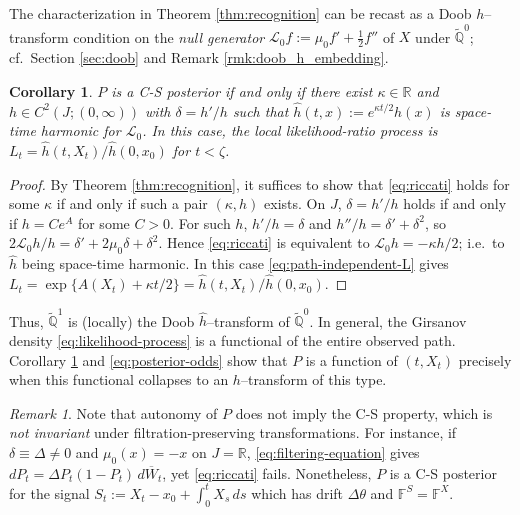 \documentclass[11pt, reqno]{amsart}
\theoremstyle{plain}
\newtheorem{corollary}[theorem]{Corollary}
\theoremstyle{remark}
\newtheorem{remark}[theorem]{Remark}
\numberwithin{equation}{section}
\begin{document}
%
%
%
%
%
%
%
%
%
%
%
%
%
%

%
%
%
%
%
%
%
%
%
%
%
%
%
%
%
%
%
%
%
%


%

The characterization in Theorem \ref{thm:recognition} can be recast as a Doob
$h$--transform condition on the \emph{null generator}
$\mathcal L_0f:=\mu_0f'+\tfrac12f''$ of $X$ under $\widetilde{\mathbb Q}^0$;
cf.\ Section \ref{sec:doob} and Remark \ref{rmk:doob_h_embedding}.

\begin{corollary}\label{cor:h-transform}
$P$ is a C-S posterior if and only if there exist $\kappa\in\mathbb R$ and
$h\in C^2(J;(0,\infty))$ with $\delta=h'/h$ such that
$\widehat h(t,x):=e^{\kappa t/2}h(x)$ is space-time harmonic for $\mathcal L_0$.
In this case, the local likelihood-ratio process is $L_t=\widehat h(t,X_t)/\widehat h(0,x_0)$ for $t<\zeta$.
\end{corollary}

\begin{proof}
By Theorem \ref{thm:recognition}, it suffices to show that \eqref{eq:riccati} holds
for some $\kappa$ if and only if such a pair $(\kappa,h)$ exists. On $J$, $\delta=h'/h$
holds if and only if $h=Ce^{A}$ for some $C>0$. For such $h$, $h'/h=\delta$ and
$h''/h=\delta'+\delta^2$, so $2\mathcal L_0h/h=\delta'+2\mu_0\delta+\delta^2$. Hence
\eqref{eq:riccati} is equivalent to $\mathcal L_0h=-\kappa h/2$; i.e.\ to $\widehat h$
being space-time harmonic. In this case \eqref{eq:path-independent-L} gives
$L_t=\exp\{A(X_t)+\kappa t/2\}=\widehat h(t,X_t)/\widehat h(0,x_0)$.
\end{proof}

Thus, $\widetilde{\mathbb Q}^1$ is (locally) the Doob
$\widehat h$--transform of $\widetilde{\mathbb Q}^0$.
In general, the Girsanov density
\eqref{eq:likelihood-process} is a functional of the entire observed path. Corollary \ref{cor:h-transform} and
\eqref{eq:posterior-odds} show that $P$ is a function of $(t,X_t)$
precisely when this functional collapses to an $h$--transform of this type.


\begin{remark}\label{rmk:scope}
Note that autonomy of $P$ does not imply the C-S property, which is \emph{not invariant}
under filtration-preserving transformations. For
instance, if $\delta\equiv\Delta\neq0$ and $\mu_0(x)=-x$ on $J=\mathbb R$,
\eqref{eq:filtering-equation} gives $dP_t=\Delta P_t(1-P_t)\,d\overline W_t$,
yet \eqref{eq:riccati} fails. Nonetheless, $P$ is a C-S posterior for the signal $S_t:=X_t-x_0+\int_0^tX_s\,ds$ which has drift $\Delta\theta$ and $\mathbb F^S=\mathbb F^X$.
\end{remark}
\end{document}
